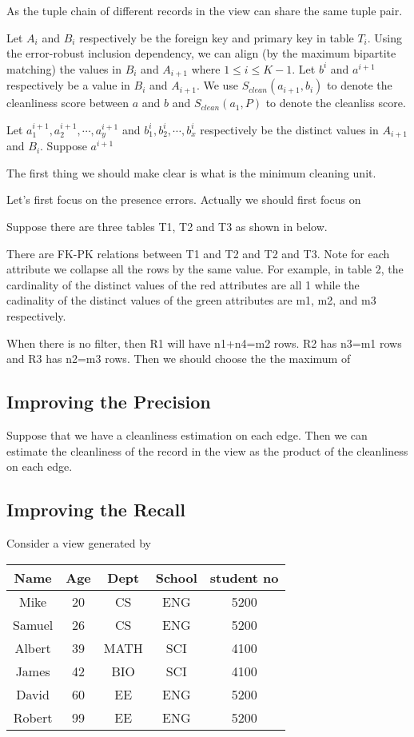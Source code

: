 As the tuple chain of different records in the view can share the same tuple
pair. 

Let $A_i$ and $B_i$ respectively be the foreign key and primary key in table
$T_i$. Using the error-robust inclusion dependency, we can align (by the maximum
bipartite matching) the values in $B_i$ and $A_{i+1}$ where $1\leq i\leq K-1$.
Let $b^i$ and $a^{i+1}$ respectively be a value in $B_i$ and $A_{i+1}$. We use
$S_{clean}(a_{i+1},b_i)$ to denote the cleanliness score between $a$ and $b$ and
$S_{clean}(a_1,P)$ to denote the cleanliss score.

Let $a^{i+1}_1, a^{i+1}_2, \cdots, a^{i+1}_y$ and $b^{i}_1, b^{i}_2, \cdots,
b^{i}_x$ respectively be the distinct values in  $A_{i+1}$ and $B_i$. Suppose
$a^{i+1}$

The first thing we should make clear is what is the minimum cleaning unit. 

Let’s first focus on the presence errors. Actually we should first focus on 

Suppose there are three tables T1, T2 and T3 as shown in below.

There are FK-PK relations between T1 and T2 and T2 and T3. Note for each
attribute we collapse all the rows by the same value. For example, in table 2,
the cardinality of the distinct values of the red attributes are all 1 while the
cadinality of the distinct values of the green attributes are m1, m2, and m3
respectively.

When there is no filter, then R1 will have n1+n4=m2 rows. R2 has n3=m1 rows and
R3 has n2=m3 rows. Then we should choose the the maximum of 

\subsection{Improving the Precision} Suppose that we have a cleanliness
estimation on each edge. Then we can estimate the cleanliness of the record in
the view as the product of the cleanliness on each edge.

\subsection{Improving the Recall}
Consider a view generated by 

\begin{table}
\centering
\begin{tabular}{|c|c|c|c|c|} \hline
Name & Age & Dept & School & student no \\\hline
Mike & 20  & CS   & ENG &  5200 \\\hline
Samuel & 26  & CS   & ENG &  5200 \\\hline
Albert & 39  & MATH & SCI &  4100 \\\hline
James  & 42  & BIO  & SCI &  4100 \\\hline
David  & 60  & EE   & ENG &  5200 \\\hline
Robert & 99  & EE   & ENG &  5200 \\\hline
\end{tabular}
\end{table}


